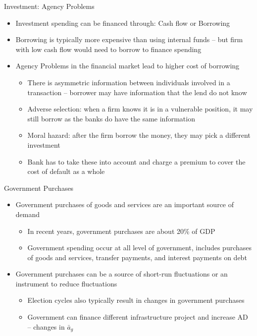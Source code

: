 \documentclass[aspectratio=1610]{beamer}
\begin{document}
\begin{frame}[wide]{Investment: Agency Problems}
	\begin{itemize}
		\item Investment spending can be financed through: Cash flow or Borrowing
		\vspace{2mm}
		\item Borrowing is typically more expensive than using internal funds -- but firm with low cash flow would need to borrow to finance spending
		\vspace{2mm}
		\item Agency Problems in the financial market lead to higher cost of borrowing
		\vspace{2mm}
		\begin{itemize}
			\item There is asymmetric information between individuals involved in a transaction -- borrower may have information that the lend do not know
			\item Adverse selection: when a firm knows it is in a vulnerable position, it may still borrow as the banks do have the same information
			\item Moral hazard: after the firm borrow the money, they may pick a different investment
			\item Bank has to take these into account and charge a premium to cover the cost of default as a whole
		\end{itemize}
	\end{itemize}
\end{frame}

\begin{frame}[wide]{Government Purchases}
	\begin{itemize}
		\item Government purchases of goods and services are an important source of demand
		\vspace{2mm}
		\begin{itemize}
			\item In recent years, government purchases are about 20\% of GDP
			\item Government spending occur at all level of government, includes purchases of goods and services, transfer payments, and interest payments on debt
		\end{itemize}
		\vspace{3mm}
		\item Government purchases can be a source of short-run fluctuations or an instrument to reduce fluctuations
		\vspace{2mm}
		\begin{itemize}
			\item Election cycles also typically result in changes in government purchases
			\item Government can finance different infrastructure project and increase AD -- changes in $\bar{a}_g$
		\end{itemize}
	\end{itemize}
\end{frame}
\end{document}
